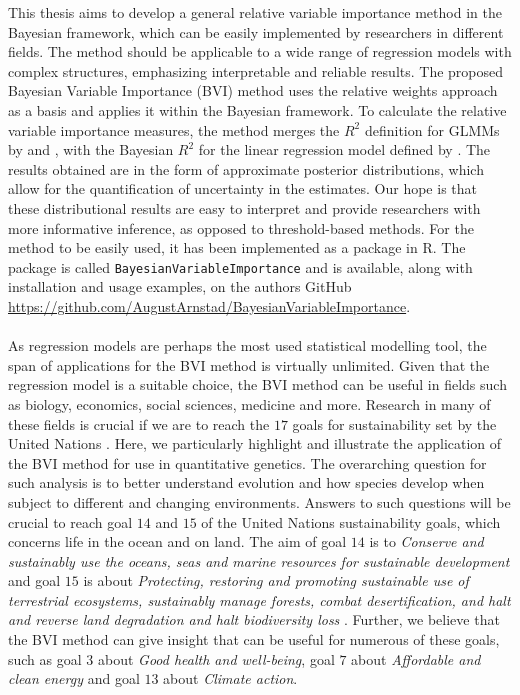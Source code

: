 This thesis aims to develop a general relative variable importance method in the Bayesian framework, which can be easily implemented by researchers in different fields. The method should be applicable to a wide range of regression models with complex structures, emphasizing interpretable and reliable results. The proposed Bayesian Variable Importance (BVI) method uses the relative weights approach as a basis and applies it within the Bayesian framework. To calculate the relative variable importance measures, the method merges the $R^2$ definition for GLMMs by \citet{nakagawa2013general} and \citet{nakagawa2017}, with the Bayesian $R^2$ for the linear regression model defined by \citet{gelman2017rsquared}. The results obtained are in the form of approximate posterior distributions, which allow for the quantification of uncertainty in the estimates. Our hope is that these distributional results are easy to interpret and provide researchers with more informative inference, as opposed to threshold-based methods. For the method to be easily used, it has been implemented as a package in R. The package is called \texttt{BayesianVariableImportance} and is available, along with installation and usage examples, on the authors GitHub \url{https://github.com/AugustArnstad/BayesianVariableImportance}. 
\\
\\
As regression models are perhaps the most used statistical modelling tool, the span of applications for the BVI method is virtually unlimited. Given that the regression model is a suitable choice, the BVI method can be useful in fields such as biology, economics, social sciences, medicine and more. Research in many of these fields is crucial if we are to reach the $17$ goals for sustainability set by the United Nations \citep{un_sdg_goals}. Here, we particularly highlight and illustrate the application of the BVI method for use in quantitative genetics. The overarching question for such analysis is to better understand evolution and how species develop when subject to different and changing environments. Answers to such questions will be crucial to reach goal $14$ and $15$ of the United Nations sustainability goals, which concerns life in the ocean and on land. The aim of goal $14$ is to \textit{Conserve and sustainably use the oceans, seas and marine resources for sustainable development} and goal $15$ is about \textit{Protecting, restoring and promoting sustainable use of terrestrial ecosystems, sustainably manage forests, combat desertification, and halt and reverse land degradation and halt biodiversity loss} \citep{un_sdg_goals}. Further, we believe that the BVI method can give insight that can be useful for numerous of these goals, such as goal $3$ about \textit{Good health and well-being}, goal $7$ about \textit{Affordable and clean energy} and goal $13$ about \textit{Climate action}.
